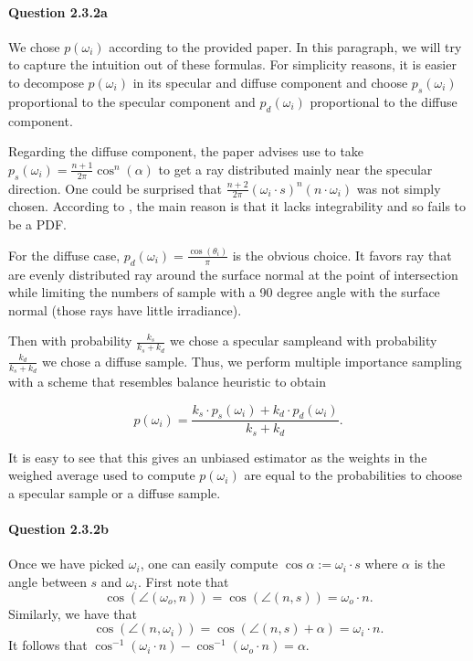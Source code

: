 \documentclass{article}
\begin{document}
\paragraph{Question 2.3.2a}
We chose $p(\omega_i)$ according to the provided paper. In this paragraph, we will try to capture the intuition out of these formulas. For simplicity reasons, it is easier to decompose $p(\omega_i)$ in its specular and diffuse component and choose $p_s(\omega_i)$ proportional to the specular component and $p_d(\omega_i)$ proportional to the diffuse component.

Regarding the diffuse component, the paper advises use to take $p_s(\omega_i) = \frac{n+1}{2\pi}\cos^n(\alpha)$ to get a ray distributed mainly near the specular direction.
One could be surprised that $\frac{n+2}{2\pi}(\omega_i \cdot s)^n(n \cdot \omega_i)$ was not simply chosen.
According to \cite{Lafortune}, the main reason is that it lacks integrability and so fails to be a PDF.

For the diffuse case, $p_d(\omega_i) = \frac{\cos(\theta_i)}{\pi}$ is the obvious choice. It favors ray that are evenly distributed ray around the surface normal at the point of intersection while limiting the numbers of sample with a 90 degree angle with the surface normal (those rays have little irradiance). 

Then with probability $\frac{k_s}{k_s + k_d}$ we chose a specular sampleand with probability $\frac{k_d}{k_s + k_d}$ we chose a diffuse sample. Thus, we perform multiple importance sampling with a scheme that resembles balance heuristic to obtain

$$p(\omega_i) = \frac{k_s \cdot p_s(\omega_i) + k_d \cdot p_d(\omega_i)}{k_s + k_d}.$$

It is easy to see that this gives an unbiased estimator as the weights in the weighed average used to compute $p(\omega_i)$ are equal to the probabilities to choose a specular sample or a diffuse sample.

\paragraph{Question 2.3.2b}Once we have picked $\omega_i$, one can easily compute\linebreak 
$\cos\alpha := \omega_i \cdot s$ where $\alpha$ is the angle between $s$ and $\omega_i$. First note that $$\cos \left (\angle(\omega_o, n)\right ) = \cos \left ( \angle(n,s) \right ) = \omega_o\cdot n.$$ Similarly, we have that
$$\cos\left(\angle (n, \omega_i)\right) = \cos\left(\angle(n,s) + \alpha\right) = \omega_i \cdot n.$$
It follows that $\cos^{-1}{\left(\omega_i \cdot n\right)} - \cos^{-1}{\left(\omega_o\cdot n\right)} = \alpha.$
\end{document}
